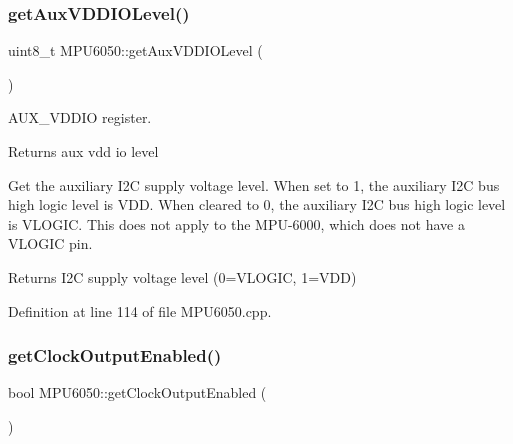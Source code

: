 \subsubsection{\texorpdfstring{getAuxVDDIOLevel()}{getAuxVDDIOLevel()}}
{\footnotesize\ttfamily uint8\+\_\+t M\+P\+U6050\+::get\+Aux\+V\+D\+D\+I\+O\+Level (\begin{DoxyParamCaption}{ }\end{DoxyParamCaption})}

A\+U\+X\+\_\+\+V\+D\+D\+IO register.

\begin{DoxyReturn}{Returns}
aux vdd io level
\end{DoxyReturn}
Get the auxiliary I2C supply voltage level. When set to 1, the auxiliary I2C bus high logic level is V\+DD. When cleared to 0, the auxiliary I2C bus high logic level is V\+L\+O\+G\+IC. This does not apply to the M\+P\+U-\/6000, which does not have a V\+L\+O\+G\+IC pin. \begin{DoxyReturn}{Returns}
I2C supply voltage level (0=V\+L\+O\+G\+IC, 1=V\+DD) 
\end{DoxyReturn}


Definition at line 114 of file M\+P\+U6050.\+cpp.


\begin{DoxyCode}{0}

\end{DoxyCode}
\mbox{\label{classMPU6050_ada96c33957bf20c04ca598a3537358ef}} 
\subsubsection{\texorpdfstring{getClockOutputEnabled()}{getClockOutputEnabled()}}
{\footnotesize\ttfamily bool M\+P\+U6050\+::get\+Clock\+Output\+Enabled (\begin{DoxyParamCaption}{ }\end{DoxyParamCaption})}

